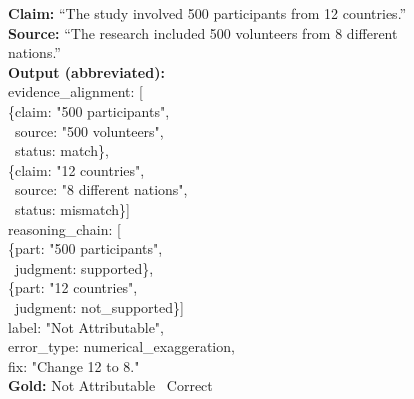 \documentclass[11pt]{article}
\newcommand{\cmark}{\ding{51}}
\begin{document}
\begin{figure}[!ht]
\begin{minipage}[t]{0.48\textwidth}
\begin{examplebox}[title={Ex.\,2: Correct ``Not Attributable''}]
\scriptsize
\textbf{Claim:} ``The study involved 500 participants from 12 countries.''\\
\textbf{Source:} ``The research included 500 volunteers from 8 different nations.''\\[1pt]
\textbf{Output (abbreviated):}\\[1pt]
{\ttfamily
\mbox{}\quad evidence\_alignment: [}\\
{\ttfamily\quad\quad\{claim: "500 participants",}\\
{\ttfamily\quad\quad\ source: "500 volunteers",}\\
{\ttfamily\quad\quad\ status: match\},}\\
{\ttfamily\quad\quad\{claim: "12 countries",}\\
{\ttfamily\quad\quad\ source: "8 different nations",}\\
{\ttfamily\quad\quad\ status: mismatch\}]}\\
{\ttfamily\quad reasoning\_chain: [}\\
{\ttfamily\quad\quad\{part: "500 participants",}\\
{\ttfamily\quad\quad\ judgment: supported\},}\\
{\ttfamily\quad\quad\{part: "12 countries",}\\
{\ttfamily\quad\quad\ judgment: not\_supported\}]}\\
{\ttfamily\quad label: "Not Attributable",}\\
{\ttfamily\quad error\_type: numerical\_exaggeration,}\\
{\ttfamily\quad fix: "Change 12 to 8."}\\[2pt]
\textbf{Gold:} Not Attributable \quad \cmark\ Correct
\end{examplebox}
\end{minipage}

\vspace{6pt}


\end{figure}
\end{document}
